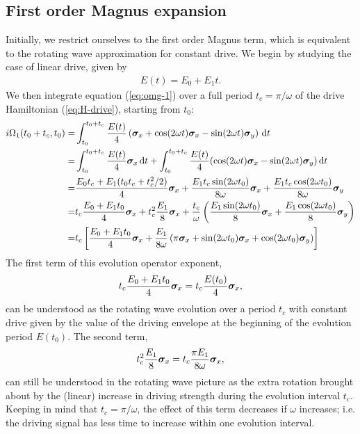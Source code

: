 \subsection{First order Magnus expansion}
Initially, we restrict ourselves to the first order Magnus term, which is equivalent to the rotating wave approximation for constant drive. We begin by studying the case of linear drive, given by
\begin{align}
	E(t) = E_0 + E_1 t.
\end{align}
We then integrate equation (\ref{eq:omg-1}) over a full period $t_c = \pi / \omega$ of the drive Hamiltonian (\ref{eq:H-drive}), starting from $t_0$:
\begin{align}
	i \Omega_1(t_0+t_c,t_0) = &\int_{t_0}^{t_0+t_c} \frac{E(t)}{4}\left( \bm{\sigma}_x + \cos(2 \omega t) \bm{\sigma}_x - \sin(2 \omega t) \bm{\sigma}_y \right) \, \mathrm{d}t \nonumber \\
	= &\int_{t_0}^{t_0+t_c} \frac{E(t)}{4} \bm{\sigma}_x \, \mathrm{d}t + \int_{t_0}^{t_0+t_c} \frac{E(t)}{4} (\cos(2 \omega t) \bm{\sigma}_x - \sin(2 \omega t) \bm{\sigma}_y) \, \mathrm{d}t \nonumber \\
	= &\frac{E_0 t_c  + E_1 (t_0 t_c + t_c^2 / 2)}{4} \bm{\sigma}_x + \frac{E_1 t_c \sin(2 \omega t_0)}{8\omega} \bm{\sigma}_x + \frac{E_1 t_c \cos(2 \omega t_0)}{8\omega} \bm{\sigma}_y \nonumber \\
	= &t_c\frac{E_0 + E_1 t_0}{4} \bm{\sigma}_x + t_c^2 \frac{E_1}{8} \bm{\sigma}_x + \frac{t_c}{\omega} \left( \frac{E_1 \sin(2 \omega t_0)}{8} \bm{\sigma}_x + \frac{E_1 \cos(2 \omega t_0)}{8} \bm{\sigma}_y \right) \nonumber \\
	= &t_c\left[ \frac{E_0 + E_1 t_0}{4} \bm{\sigma}_x + \frac{E_1}{8 \omega} \left( \pi \bm{\sigma}_x + \sin(2 \omega t_0) \bm{\sigma}_x + \cos(2 \omega t_0) \bm{\sigma}_y \right) \right] \label{eq:evexp-order-1}
\end{align}
The first term of this evolution operator exponent,
\begin{align}
	\label{eq:evexp-rwa-constant-term}
	t_c \frac{E_0 + E_1 t_0}{4} \bm{\sigma}_x = t_c \frac{E(t_0)}{4} \bm{\sigma}_x,
\end{align}
can be understood as the rotating wave evolution over a period $t_c$ with constant drive given by the value of the driving envelope at the beginning of the evolution period $E(t_0)$. The second term,
\begin{align}
	\label{eq:evexp-rwa-linear-term}
	t_c^2\frac{E_1}{8}\bm{\sigma}_x=t_c\frac{\pi E_1}{8 \omega}\bm{\sigma}_x,
\end{align}
can still be understood in the rotating wave picture as the extra rotation brought about by the (linear) increase in driving strength during the evolution interval $t_c$. Keeping in mind that $t_c = \pi / \omega$, the effect of this term decreases if $\omega$ increases; i.e. the driving signal has less time to increase within one evolution interval. 


